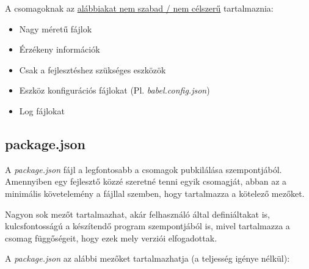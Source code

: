 A csomagoknak az \underline{alábbiakat nem szabad / nem célszerű} tartalmaznia:

\begin{itemize}
	\item Nagy méretű fájlok
	\item Érzékeny információk
	\item Csak a fejlesztéshez szükséges eszközök
	\item Eszköz konfigurációs fájlokat (Pl. \emph{babel.config.json})
	\item Log fájlokat
\end{itemize}

\begin{flushright}
	\cite{npm-packages}
\end{flushright}

	\subsection{package.json}
	
	A \emph{package.json} fájl a legfontosabb a csomagok pubkilálása szempontjából. Amennyiben egy fejlesztő közzé szeretné tenni egyik csomagját, abban az a minimális követelemény a fájllal szemben, hogy tartalmazza a kötelező mezőket.
	
	Nagyon sok mezőt tartalmazhat, akár felhasználó által definiáltakat is, kulcsfontosságú a készítendő program szempontjából is, mivel tartalmazza a csomag függőségeit, hogy ezek mely verziói elfogadottak.
	
	A \emph{package.json} az alábbi mezőket tartalmazhatja (a teljesség igénye nélkül):
	
